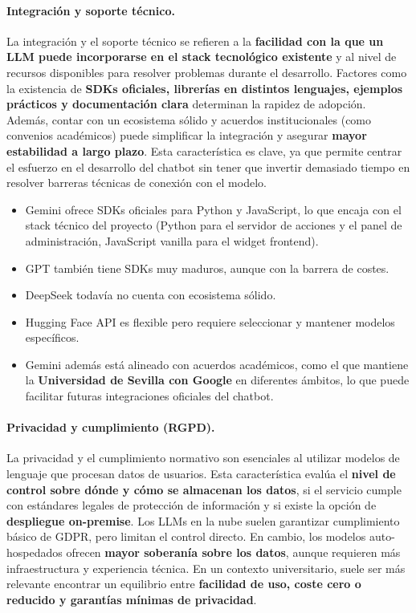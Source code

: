 \paragraph{Integración y soporte técnico.}

La integración y el soporte técnico se refieren a la \textbf{facilidad con la que un LLM puede incorporarse en el stack tecnológico existente} y al nivel de recursos disponibles para resolver problemas durante el desarrollo. Factores como la existencia de \textbf{SDKs oficiales, librerías en distintos lenguajes, ejemplos prácticos y documentación clara} determinan la rapidez de adopción. Además, contar con un ecosistema sólido y acuerdos institucionales (como convenios académicos) puede simplificar la integración y asegurar \textbf{mayor estabilidad a largo plazo}. Esta característica es clave, ya que permite centrar el esfuerzo en el desarrollo del chatbot sin tener que invertir demasiado tiempo en resolver barreras técnicas de conexión con el modelo.

\begin{itemize}
    \item Gemini ofrece SDKs oficiales para Python y JavaScript, lo que encaja con el stack técnico del proyecto (Python para el servidor de acciones y el panel de administración, JavaScript vanilla para el widget frontend).
    \item GPT también tiene SDKs muy maduros, aunque con la barrera de costes.
    \item DeepSeek todavía no cuenta con ecosistema sólido.
    \item Hugging Face API es flexible pero requiere seleccionar y mantener modelos específicos.
    \item Gemini además está alineado con acuerdos académicos, como el que mantiene la \textbf{Universidad de Sevilla con Google} en diferentes ámbitos, lo que puede facilitar futuras integraciones oficiales del chatbot.
\end{itemize}

\paragraph{Privacidad y cumplimiento (RGPD).}

La privacidad y el cumplimiento normativo son esenciales al utilizar modelos de lenguaje que procesan datos de usuarios. Esta característica evalúa el \textbf{nivel de control sobre dónde y cómo se almacenan los datos}, si el servicio cumple con estándares legales de protección de información y si existe la opción de \textbf{despliegue on-premise}. Los LLMs en la nube suelen garantizar cumplimiento básico de GDPR, pero limitan el control directo. En cambio, los modelos auto-hospedados ofrecen \textbf{mayor soberanía sobre los datos}, aunque requieren más infraestructura y experiencia técnica. En un contexto universitario, suele ser más relevante encontrar un equilibrio entre \textbf{facilidad de uso, coste cero o reducido y garantías mínimas de privacidad}.

